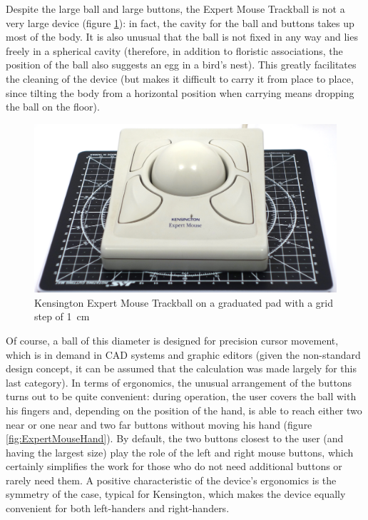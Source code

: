 \documentclass[11pt, a4paper]{article}
\begin{document}
Despite the large ball and large buttons, the Expert Mouse Trackball is not a very large device (figure \ref{fig:ExpertMouseSize}): in fact, the cavity for the ball and buttons takes up most of the body. It is also unusual that the ball is not fixed in any way and lies freely in a spherical cavity (therefore, in addition to floristic associations, the position of the ball also suggests an egg in a bird's nest). This greatly facilitates the cleaning of the device (but makes it difficult to carry it from place to place, since tilting the body from a horizontal position when carrying means dropping the ball on the floor).

\begin{figure}[h]
    \centering
    \includegraphics[scale=0.3]{1996_kensington_expert_trackball_5/size_30.jpg}
    \caption{Kensington Expert Mouse Trackball on a graduated pad with a grid step of 1~cm}
    \label{fig:ExpertMouseSize}
\end{figure}

Of course, a ball of this diameter is designed for precision cursor movement, which is in demand in CAD systems and graphic editors (given the non-standard design concept, it can be assumed that the calculation was made largely for this last category). In terms of ergonomics, the unusual arrangement of the buttons turns out to be quite convenient: during operation, the user covers the ball with his fingers and, depending on the position of the hand, is able to reach either two near or one near and two far buttons without moving his hand (figure \ref{fig:ExpertMouseHand}). By default, the two buttons closest to the user (and having the largest size) play the role of the left and right mouse buttons, which certainly simplifies the work for those who do not need additional buttons or rarely need them. A positive characteristic of the device's ergonomics is the symmetry of the case, typical for Kensington, which makes the device equally convenient for both left-handers and right-handers.
\end{document}
